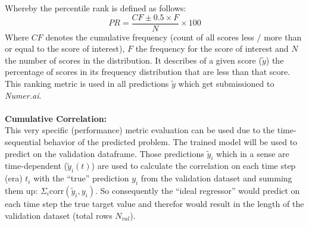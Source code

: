 \documentclass[12pt, a4paper]{article}
\begin{document}
Whereby the percentile rank is defined as follows:
\begin{equation}
    PR = \frac{CF \pm 0.5 \times F}{N} \times 100
\end{equation}
Where $CF$ denotes the cumulative frequency (count of all scores less / more than or equal to the score of interest), $F$ the frequency for the score of interest and $N$ the number of scores in the distribution. It describes of a given score ($\tilde{y}$) the percentage of scores in its frequency distribution that are less than that score. This ranking metric is used in all predictions $\tilde{y}$ which get submissioned to \textit{Numer.ai}. \\
\\
\textbf{Cumulative Correlation:} \\
This very specific (performance) metric evaluation can be used due to the time-sequential behavior of the predicted problem. The trained model will be used to predict on the validation dataframe. Those predictions $\tilde{y}_i$ which in a sense are time-dependent ($\tilde{y}_i(t)$) are used to calculate the correlation on each time step (era) $t_i$ with the ``true'' prediction $y_i$ from the validation dataset and summing them up: $\Sigma_i \text{corr}(\tilde{y}_i,y_i)$. So consequently the ``ideal regressor'' would predict on each time step the true target value and therefor would result in the length of the validation dataset (total rows $N_{val}$).

\newpage
\end{document}
